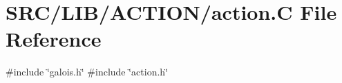 \hypertarget{action_8_c}{}\section{S\+R\+C/\+L\+I\+B/\+A\+C\+T\+I\+O\+N/action.C File Reference}
\label{action_8_c}
{\ttfamily \#include \char`\"{}galois.\+h\char`\"{}}\newline
{\ttfamily \#include \char`\"{}action.\+h\char`\"{}}\newline
